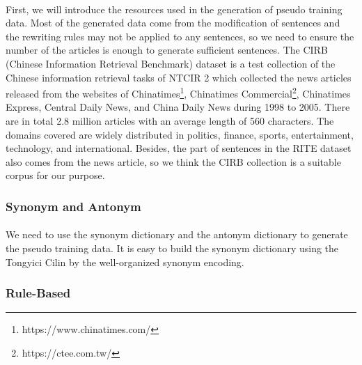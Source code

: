 \documentclass[12pt]{article}
\begin{document}
\begin{CJK*}{UTF8}{bkai}
\begin{spacing}{1.77}
\paragraph{}
First, we will introduce the resources used in the generation of pseudo training data. Most of the generated data come from the modification of sentences and the rewriting rules may not be applied to any sentences, so we need to ensure the number of the articles is enough to generate sufficient sentences. The CIRB (Chinese Information Retrieval Benchmark)\cite{chen2001cirb} dataset is a test collection of the Chinese information retrieval tasks of NTCIR 2 which collected the news articles released from the websites of Chinatimes\footnote{https://www.chinatimes.com/}, Chinatimes Commercial\footnote{https://ctee.com.tw/}, Chinatimes Express, Central Daily News, and China Daily News during 1998 to 2005. There are in total 2.8 million articles with an average length of 560 characters. The domains covered are widely distributed in politics, finance, sports, entertainment, technology, and international. Besides, the part of sentences in the RITE dataset also comes from the news article, so we think the CIRB collection is a suitable corpus for our purpose.

\subsubsection{Synonym and Antonym}
\paragraph{}
We need to use the synonym dictionary and the antonym dictionary to generate the pseudo training data. It is easy to build the synonym dictionary using the Tongyici Cilin by the well-organized synonym encoding.

\subsubsection{Rule-Based}

\end{spacing}
\end{CJK*}
\end{document}
